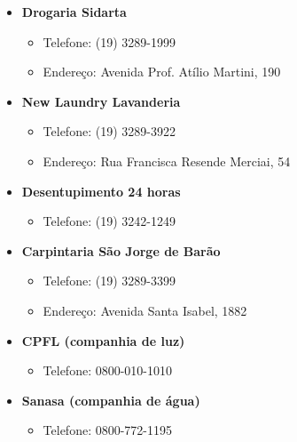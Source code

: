\begin{itemize}
\item  \textbf{Drogaria Sidarta}
\begin{itemize}
\item  Telefone: (19) 3289-1999
\item  Endereço: Avenida Prof. Atílio Martini, 190
\end{itemize}
\end{itemize}

\begin{itemize}
\item  \textbf{New Laundry Lavanderia}
\begin{itemize}
\item  Telefone: (19) 3289-3922
\item  Endereço: Rua Francisca Resende Merciai, 54
\end{itemize}
\end{itemize}

\begin{itemize}
\item  \textbf{Desentupimento 24 horas}
\begin{itemize}
\item  Telefone: (19) 3242-1249
\end{itemize}
\end{itemize}

\begin{itemize}
\item  \textbf{Carpintaria São Jorge de Barão}
\begin{itemize}
\item  Telefone: (19) 3289-3399
\item  Endereço: Avenida Santa Isabel, 1882
\end{itemize}
\end{itemize}

\begin{itemize}
\item  \textbf{CPFL (companhia de luz)}
\begin{itemize}
\item  Telefone: 0800-010-1010
\end{itemize}
\end{itemize}

\begin{itemize}
\item  \textbf{Sanasa (companhia de água)}
\begin{itemize}
\item  Telefone: 0800-772-1195
\end{itemize}
\end{itemize}

